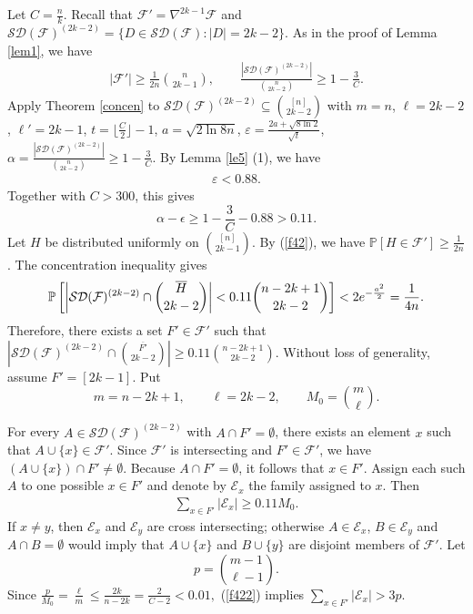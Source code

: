 \documentclass[11pt]{article}
\numberwithin{equation}{section}
\begin{document}
Let $C = \frac{n}{k}$. Recall that $\mathcal{F}' = \nabla^{2k-1}\mathcal{F}$ and 
$
\mathcal{SD}(\mathcal{F})^{(2k-2)} = \{D\in \mathcal{SD}(\mathcal{F}): |D|=2k-2\}.
$
As in the proof of Lemma \ref{lem1}, we have
 \begin{align}
|\mathcal{F}'| \geq \frac{1}{2n} \binom{n}{2k-1},\qquad \frac{|\mathcal{SD}(\mathcal{F})^{(2k-2)}|}{\binom{n}{2k-2}} \geq 1 - \frac{3}{C}. \label{f42}
 \end{align}
Apply Theorem \ref{concen} to $\mathcal{SD}(\mathcal{F})^{(2k-2)}\subseteq \binom{[n]}{2k-2}$ with $m=n$, $\ell=2k-2$, $\ell'=2k-1$, $t=\lfloor \frac{C}{2} \rfloor-1$, $a=\sqrt{2\ln 8n}$, $\varepsilon=\frac{2a+\sqrt{8\ln 2}}{\sqrt{t}}$, $\alpha=\frac{|\mathcal{SD}(\mathcal{F})^{(2k-2)}|}{\binom{n}{2k-2}}\ge 1-\frac{3}{C}$.
By Lemma \ref{le5} (1), we have
\begin{align*}
 \varepsilon <0.88.
\end{align*}
Together with $C>300$, this gives
$$
\alpha-\epsilon \geq 1-\frac{3}{C}-0.88 > 0.11.
$$
 Let $H$ be distributed uniformly on $\binom{[n]}{2k-1}$. 
By (\ref{f42}), we have $\mathbb P\left[H\in \mathcal{F}'\right]\ge \frac{1}{2n}$.
The concentration inequality gives
   $$\mathbb P\left[\left|\mathcal{SD}(\mathcal{F})^{(2k-2)}\cap \binom{\overline{H}}{2k-2}\right|< 0.11\binom{n-2k+1}{2k-2}\right]< 2e^{-\frac{\mathstrut{a^2}}{2}}=\frac{1}{4n}.$$
	Therefore,  there exists a set $F'\in \mathcal{F}'$ such that $\left|\mathcal{SD}(\mathcal{F})^{(2k-2)}\cap\binom{\overline{F'}}{2k-2}\right|\ge0.11\binom{n-2k+1}{2k-2}$. Without loss of generality,  assume $F'=[2k-1]$.
 Put
$$
m=n-2k+1,\qquad \ell=2k-2,\qquad M_0=\binom{m}{\ell}.
$$


For every $A\in \mathcal{SD}(\mathcal{F})^{(2k-2)}$ with $A\cap F'=\emptyset$, there exists an element $x$ such that $A\cup\{x\}\in \mathcal{F}'$. Since $\mathcal{F}'$ is intersecting and $F'\in \mathcal{F}'$, we have $(A\cup\{x\})\cap F'\neq \emptyset$. Because $A\cap F'=\emptyset$, it follows that $x\in F'$. Assign each such $A$ to one possible $x\in F'$ and denote by $\mathcal{E}_x$ the family assigned to $x$. Then
\begin{align}
\sum_{x\in F'}|\mathcal{E}_x|\geq 0.11M_0. \label{f422}
\end{align}
If $x\neq y$, then $\mathcal{E}_x$ and $\mathcal{E}_y$ are cross intersecting; otherwise $A\in \mathcal{E}_x$, $B\in \mathcal{E}_y$ and $A\cap B=\emptyset$ would imply that $A\cup\{x\}$ and $B\cup\{y\}$ are disjoint members of $\mathcal{F}'$.
Let
$$
p=\binom{m-1}{\ell-1}.
$$
Since
$
\frac{p}{M_0}=\frac{\ell}{m}\leq \frac{2k}{n-2k}=\frac{2}{C-2}<0.01,
$
(\ref{f422}) implies $\sum_{x\in F'}|\mathcal{E}_x|>3p$.
\end{document}
